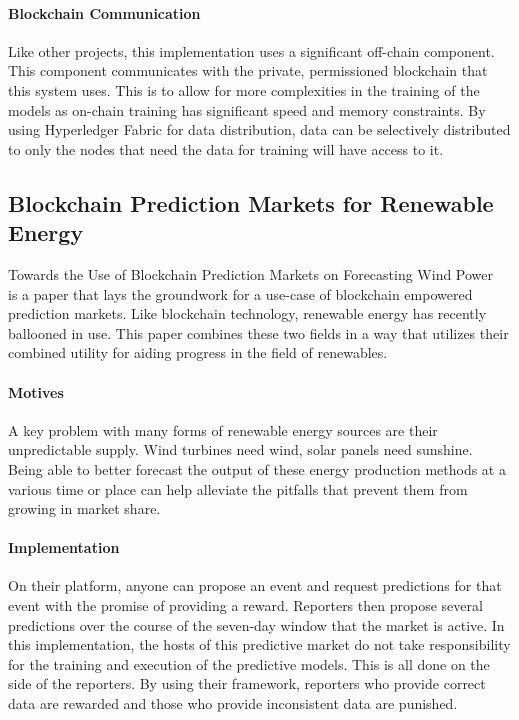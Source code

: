 \documentclass{ledger}
\begin{document}
\paragraph{Blockchain Communication}
Like other projects, this implementation uses a significant off-chain component.  This component communicates
with the private, permissioned blockchain that this system uses.  This is to allow for more complexities
in the training of the models as on-chain training has significant speed and memory constraints.  By using Hyperledger
Fabric for data distribution, data can be selectively distributed to only the nodes that need the data for training will
have access to it.

\subsection{Blockchain Prediction Markets for Renewable Energy}

Towards the Use of Blockchain Prediction Markets on Forecasting Wind Power~\cite{windForcasting} is a paper that lays the
groundwork for a use-case of blockchain empowered prediction markets. Like blockchain technology, renewable energy has
recently ballooned in use.  This paper combines these two fields in a way that utilizes their combined utility for
aiding progress in the field of renewables.

\paragraph{Motives}
A key problem with many forms of renewable energy sources are their unpredictable supply. Wind turbines need wind,
solar panels need sunshine. Being able to better forecast the output of these energy production methods at a various
time or place can help alleviate the pitfalls that prevent them from growing in market share.

\paragraph{Implementation}
On their platform, anyone can propose an event and request predictions for that event with the promise of providing
a reward.  Reporters then propose several predictions over the course of the seven-day window that the market is
active.  In this implementation, the hosts of this predictive market do not take responsibility for the training
and execution of the predictive models.  This is all done on the side of the reporters.  By using their framework,
reporters who provide correct data are rewarded and those who provide inconsistent data are punished.
\end{document}
